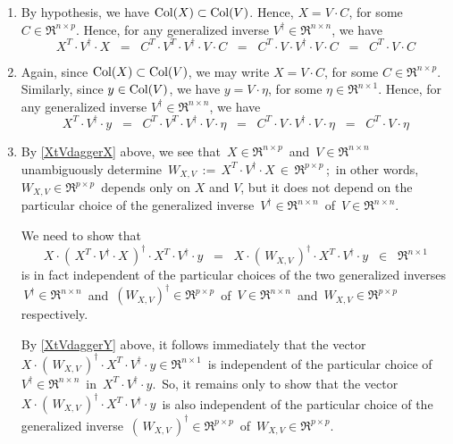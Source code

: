 \begin{enumerate}
\item
	By hypothesis, we have $\textnormal{Col}(X) \subset \textnormal{Col}(V)$.
	Hence, $X = V \cdot C$, for some $C \in \Re^{n \times p}$.
	Hence, for any generalized inverse $V^{\dagger} \in \Re^{n \times n}$,
	we have
	\begin{equation*}
	X^{T} \cdot V^{\dagger} \cdot X
	\;\; = \;\;
		C^{T} \cdot V^{T} \cdot V^{\dagger} \cdot V \cdot C
	\;\; = \;\;
		C^{T} \cdot V \cdot V^{\dagger} \cdot V \cdot C
	\;\; = \;\;
		C^{T} \cdot V \cdot C
	\end{equation*}
\item
	Again, since $\textnormal{Col}(X) \subset \textnormal{Col}(V)$, we may write
	$X = V \cdot C$, for some $C \in \Re^{n \times p}$.
	Similarly, since $y \in \textnormal{Col}(V)$, we have $y = V \cdot \eta$,
	for some $\eta \in \Re^{n \times 1}$.
	Hence, for any generalized inverse $V^{\dagger} \in \Re^{n \times n}$,
	we have
	\begin{equation*}
	X^{T} \cdot V^{\dagger} \cdot y
	\;\; = \;\;
		C^{T} \cdot V^{T} \cdot V^{\dagger} \cdot V \cdot \eta
	\;\; = \;\;
		C^{T} \cdot V \cdot V^{\dagger} \cdot V \cdot  \eta
	\;\; = \;\;
		C^{T} \cdot V \cdot \eta
	\end{equation*}
\item
	By \eqref{XtVdaggerX} above, we see that
	\,$X \in \Re^{n \times p}$\, and \,$V \in \Re^{n \times n}$\,
	unambiguously determine
	\,$W_{X,V} \, := \, X^{T} \cdot V^{\dagger} \cdot X \, \in \, \Re^{p \times p}$\,;\,
	in other words, \,$W_{X,V} \in \Re^{p \times p}$\, depends only on $X$ and $V$,
	but it does not depend on the particular choice of the generalized inverse
	\,$V^{\dagger} \in \Re^{n \times n}$\, of \,$V \in \Re^{n \times n}$.
	
	We need to show that
	\begin{equation*}
	X \cdot \left(\,X^{T} \cdot V^{\dagger} \cdot X\,\right)^{\dagger} \cdot X^{T} \cdot V^{\dagger} \cdot y
	\;\; = \;\;
		X \cdot \left(\,W_{X,V}\,\right)^{\dagger} \cdot X^{T} \cdot V^{\dagger} \cdot y
	\;\; \in \;\; \Re^{n \times 1}
	\end{equation*}
	is in fact independent of the particular choices of the two generalized inverses
	\,$V^{\dagger} \in \Re^{n \times n}$\, and \,$(W_{X,V})^{\dagger} \in \Re^{p \times p}$\,
	of \,$V \in \Re^{n \times n}$\, and \,$W_{X,V} \in \Re^{p \times p}$\, respectively.

	By \eqref{XtVdaggerY} above, it follows immediately that the vector
	\,$X \cdot \left(\,W_{X,V}\,\right)^{\dagger} \cdot X^{T} \cdot V^{\dagger} \cdot y \in \Re^{n \times 1}$\,
	is independent of the particular choice of
	\,$V^{\dagger} \in \Re^{n \times n}$\, in \,$X^{T} \cdot V^{\dagger} \cdot y$.\,
	So, it remains only to show that the vector
	\,$X \cdot \left(\,W_{X,V}\,\right)^{\dagger} \cdot X^{T} \cdot V^{\dagger} \cdot y$\,
	is also independent of the particular choice of the generalized inverse
	\,$\left(\,W_{X,V}\,\right)^{\dagger}  \in \Re^{p \times p}$\,
	of \,$W_{X,V} \in \Re^{p \times p}$.


\end{enumerate}
